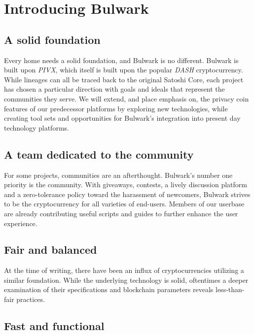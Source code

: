 \documentclass[11pt,a4paperpaper,]{report}
\begin{document}
\chapter{Introducing Bulwark}\label{introducing-bulwark}

\section{A solid foundation}\label{a-solid-foundation}

Every home needs a solid foundation, and Bulwark is no different.
Bulwark is built upon \textit{PIVX}, which itself is built upon the
popular \textit{DASH} cryptocurrency. While lineages can all be traced
back to the original Satoshi Core, each project has chosen a particular
direction with goals and ideals that represent the communities they
serve. We will extend, and place emphasis on, the privacy coin features
of our predecessor platforms by exploring new technologies, while
creating tool sets and opportunities for Bulwark's integration into
present day technology platforms.

\section{A team dedicated to the
community}\label{a-team-dedicated-to-the-community}

For some projects, communities are an afterthought. Bulwark's number one
priority is the community. With giveaways, contests, a lively discussion
platform and a zero-tolerance policy toward the harassment of newcomers,
Bulwark strives to be the cryptocurrency for all varieties of end-users.
Members of our userbase are already contributing useful scripts and
guides to further enhance the user experience.

\section{Fair and balanced}\label{fair-and-balanced}

At the time of writing, there have been an influx of cryptocurrencies
utilizing a similar foundation. While the underlying technology is
solid, oftentimes a deeper examination of their specifications and
blockchain parameters reveals less-than-fair practices.

\section{Fast and functional}\label{fast-and-functional}
\end{document}
